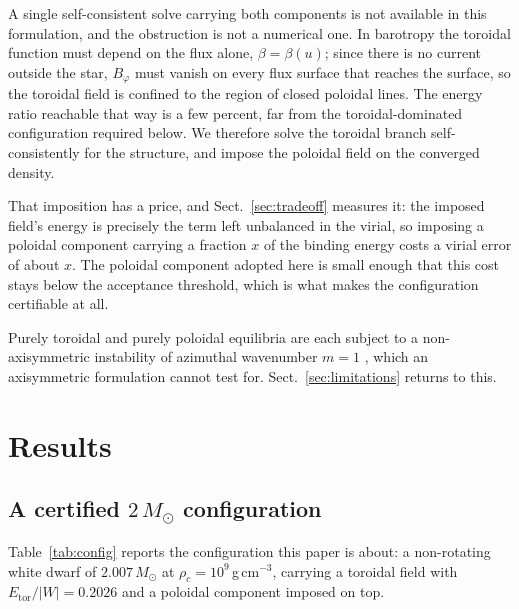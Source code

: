 \documentclass{aa}
\begin{document}
A single self-consistent solve carrying both components is not available
in this formulation, and the obstruction is not a numerical one. In
barotropy the toroidal function must depend on the flux alone,
$\beta = \beta(u)$; since there is no current outside the star,
$B_\varphi$ must vanish on every flux surface that reaches the surface,
so the toroidal field is confined to the region of closed poloidal lines.
The energy ratio reachable that way is a few percent, far from the
toroidal-dominated configuration required below. We therefore solve the
toroidal branch self-consistently for the structure, and impose the
poloidal field on the converged density.

That imposition has a price, and Sect.~\ref{sec:tradeoff} measures it:
the imposed field's energy is precisely the term left unbalanced in the
virial, so imposing a poloidal component carrying a fraction $x$ of the
binding energy costs a virial error of about $x$. The poloidal component
adopted here is small enough that this cost stays below the acceptance
threshold, which is what makes the configuration certifiable at all.

Purely toroidal and purely poloidal equilibria are each subject to a
non-axisymmetric instability of azimuthal wavenumber $m=1$
\citep{tayler1973,markey1973}, which an axisymmetric formulation cannot
test for. Sect.~\ref{sec:limitations} returns to this.


\section{Results}
\label{sec:results}

\subsection{A certified $2\,M_\odot$ configuration}
\label{sec:certified}

Table~\ref{tab:config} reports the configuration this paper is about: a
non-rotating white dwarf of $2.007\,M_\odot$ at
$\rho_c = 10^9$\,g\,cm$^{-3}$, carrying a toroidal field with
$E_{\mathrm{tor}}/|W| = 0.2026$ and a poloidal component imposed on top.
\end{document}
